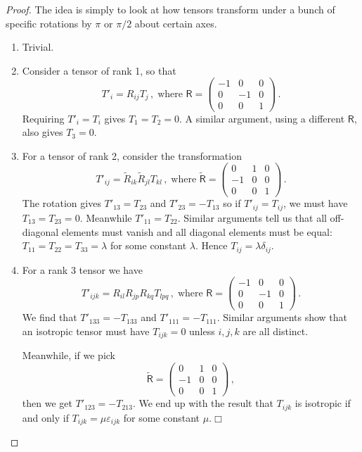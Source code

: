 \documentclass{article}
\theoremstyle{plain}\theoremheaderfont{\normalfont\itshape}\theorembodyfont{\rmfamily}\theoremseparator{.}\newtheorem*{rem}{Remark}\newtheorem*{ex}{Example}\newtheorem*{proof}{Proof}\newtheorem*{altp}{Alternative proof}
\theoremstyle{plain}\theoremheaderfont{\normalfont\bfseries}\theorembodyfont{\rmfamily}\theoremseparator{.}\newtheorem{thm}{Theorem}[section]\newtheorem{lem}[thm]{Lemma}\newtheorem{prop}[thm]{Proposition}\newtheorem*{cor}{Corollary}\newtheorem{defn}[thm]{Definition}\newtheorem{clm}[thm]{Claim}\newtheorem{clminproof}{Claim}
\theoremstyle{break}\theoremheaderfont{\normalfont\itshape}\theorembodyfont{\rmfamily}\theoremseparator{.\medskip}\newtheorem*{proofskip}{Proof}\newtheorem*{exs}{Examples}\newtheorem*{rems}{Remarks}
\theoremstyle{break}\theoremheaderfont{\normalfont\bfseries}\theorembodyfont{\rmfamily}\theoremseparator{.\medskip}\newtheorem{lemskip}[thm]{Lemma}\newtheorem{defnskip}[thm]{Definition}\newtheorem{propskip}[thm]{Proposition}\newtheorem{thmskip}[thm]{Theorem}
\numberwithin{equation}{section}
\newcommand{\qed}{\hfill\ensuremath{\Box}}
\begin{document}
	\begin{proof}
		The idea is simply to look at how tensors transform under a bunch of specific rotations by \(\pi\) or \(\pi/2\) about certain axes.
		\begin{enumerate}[topsep=0pt]
			\item Trivial.
			\item Consider a tensor of rank 1, so that
			\[T'_i=R_{ij}T_j\,,\;\text{where }\mathsf{R}=\begin{pmatrix}
				-1 & 0 & 0\\
				0 & -1 & 0\\
				0 & 0 & 1
			\end{pmatrix}\,.\]
			Requiring \(T'_i=T_i\) gives \(T_1=T_2=0\). A similar argument, using a different \(\mathsf{R}\),	also gives \(T_3=0\).
			\item For a tensor of rank 2, consider the transformation
			\[T'_{ij}=\tilde{R}_{ik}\tilde{R}_{jl}T_{kl}\,,\;\text{where }\mathsf{\tilde{R}}=\begin{pmatrix}
				0 & 1 & 0\\
				-1 & 0 & 0\\
				0 & 0 & 1
			\end{pmatrix}\,.\]
			The rotation gives \(T'_{13}=T_{23}\) and \(T'_{23}=-T_{13}\) so if \(T'_{ij}=T_{ij}\), we must have \(T_{13}=T_{23}=0\). Meanwhile \(T'_{11}=T_{22}\). Similar arguments tell us that all off-diagonal elements must vanish and all diagonal elements must be equal: \(T_{11}=T_{22}=T_{33}=\lambda\) for some constant \(\lambda\). Hence \(T_{ij}=\lambda\delta_{ij}\).
			\item For a rank 3 tensor we have
			\[T'_{ijk}=R_{il}R_{jp}R_{kq}T_{lpq}\,,\;\text{where }\mathsf{R}=\begin{pmatrix}
				-1 & 0 & 0\\
				0 & -1 & 0\\
				0 & 0 & 1
			\end{pmatrix}\,.\]
			We find that \(T'_{133}=-T_{133}\) and \(T'_{111}=-T_{111}\). Similar arguments show that an isotropic tensor must have \(T_{ijk}=0\) unless \(i,j,k\) are all distinct.
			
			Meanwhile, if we pick
			\[\mathsf{\tilde{R}}=\begin{pmatrix}
				0 & 1 & 0\\
				-1 & 0 & 0\\
				0 & 0 & 1
			\end{pmatrix}\,,\]
			then we get \(T'_{123}=-T_{213}\). We end up with the result that \(T_{ijk}\) is isotropic if and only if \(T_{ijk}=\mu\varepsilon_{ijk}\) for some constant \(\mu\).\qed
		\end{enumerate}
	\end{proof}
\end{document}

